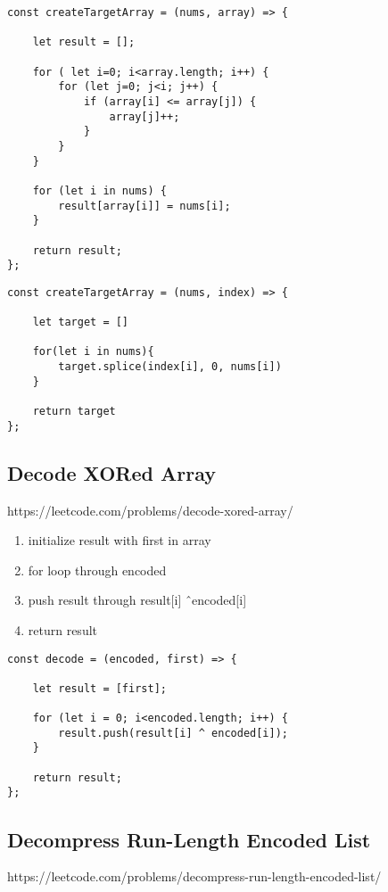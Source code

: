 \documentclass[10pt]{article}
\begin{document}
\begin{lstlisting}[title=Solution createTargetArray, captionpos=t]
const createTargetArray = (nums, array) => {

    let result = [];
    
    for ( let i=0; i<array.length; i++) {
        for (let j=0; j<i; j++) {
            if (array[i] <= array[j]) {
                array[j]++;
            }
        }
    }
    
    for (let i in nums) {
        result[array[i]] = nums[i];
    }
    
    return result;
};
\end{lstlisting}

\begin{lstlisting}[title=Solution createTargetArray with splice(), captionpos=t]
const createTargetArray = (nums, index) => {
    
    let target = []
    
    for(let i in nums){
        target.splice(index[i], 0, nums[i])
    }
        
    return target
};
\end{lstlisting}
\medskip %

\pagebreak
\medskip %
\subsection{Decode XORed Array}
https://leetcode.com/problems/decode-xored-array/

\begin{enumerate}
	\item initialize result with first in array
	\item for loop through encoded
	\item push result through result[i] \^\ encoded[i]
	\item return result
\end{enumerate}

\begin{lstlisting}[title=Solution decode, captionpos=t]
const decode = (encoded, first) => {

    let result = [first];
    
    for (let i = 0; i<encoded.length; i++) {
        result.push(result[i] ^ encoded[i]);
    }
    
    return result;
};
\end{lstlisting}
\medskip %


\pagebreak
\medskip %
\subsection{Decompress Run-Length Encoded List}
https://leetcode.com/problems/decompress-run-length-encoded-list/
\end{document}
